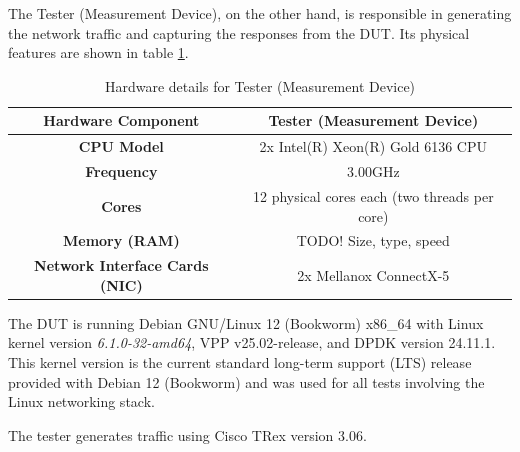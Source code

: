 The Tester (Measurement Device), on the other hand, is responsible in generating the network traffic and capturing the responses from the DUT.
Its physical features are shown in table \ref{tab:hardware_tester}. 

\begin{table}[h!]
\centering
\caption{Hardware details for Tester (Measurement Device)}
\begin{tabular}{|c|c|}
\hline
\textbf{Hardware Component} & \textbf{Tester (Measurement Device)} \\
\hline
\textbf{CPU Model} & 2x Intel(R) Xeon(R) Gold 6136 CPU \\
\hline
\textbf{Frequency} & 3.00GHz \\
\hline
\textbf{Cores} & 12 physical cores each (two threads per core)\\
\hline
\textbf{Memory (RAM)} & TODO! Size, type, speed \\
\hline
\textbf{Network Interface Cards (NIC)} & 2x Mellanox ConnectX-5 \\
\hline
\end{tabular}
\label{tab:hardware_tester}
\end{table}

The DUT is running Debian GNU/Linux 12 (Bookworm) x86\_64 with Linux kernel version \textit{6.1.0-32-amd64}, VPP v25.02-release, and DPDK version 24.11.1. 
This kernel version is the current standard long-term support (LTS) release provided with Debian 12 (Bookworm) and was used for all tests involving the Linux networking stack.

The tester generates traffic using Cisco TRex version 3.06.
